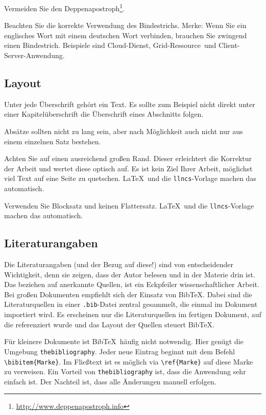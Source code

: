 \documentclass{llncs}
\begin{document}
Vermeiden Sie den Deppenapostroph\footnote{\url{http://www.deppenapostroph.info}}.

Beachten Sie die korrekte Verwendung des Bindestrichs. Merke: Wenn Sie ein englisches Wort mit einem deutschen Wort verbinden, brauchen Sie zwingend einen Bindestrich. Beispiele sind \glqq Cloud-Dienst\grqq, \glqq Grid-Ressource\grqq\ und \glqq Client-Server-Anwendung\grqq.

\subsection{Layout}

Unter jede Überschrift gehört ein Text. Es sollte zum Beispiel nicht direkt unter einer Kapitelüberschrift die Überschrift eines Abschnitts folgen.

Absätze sollten nicht zu lang sein, aber nach Möglichkeit auch nicht nur aus einem einzelnen Satz bestehen.

Achten Sie auf einen ausreichend großen Rand. Dieser erleichtert die Korrektur der Arbeit und wertet diese optisch auf. Es ist kein Ziel Ihrer Arbeit, möglichst viel Text auf eine Seite zu quetschen. \LaTeX\ und die \texttt{llncs}-Vorlage machen das automatisch.

Verwenden Sie Blocksatz und keinen Flattersatz. \LaTeX\ und die \texttt{llncs}-Vorlage machen das automatisch.

\subsection{Literaturangaben}

Die Literaturangaben (und der Bezug auf diese!) sind von entscheidender Wichtigkeit, denn sie zeigen, dass der Autor belesen und in der Materie drin ist. Das beziehen auf anerkannte Quellen, ist ein Eckpfeiler wissenschaftlicher Arbeit. Bei großen Dokumenten empfiehlt sich der Einsatz von Bib\TeX. Dabei sind die Literaturquellen in einer \verb!.bib!-Datei zentral gesammelt, die einmal im Dokument importiert wird. Es erscheinen nur die Literaturquellen im fertigen Dokument, auf die referenziert wurde und das Layout der Quellen steuert Bib\TeX.

Für kleinere Dokumente ist Bib\TeX\ häufig nicht notwendig. Hier genügt die Umgebung \texttt{thebibliography}. Jeder neue Eintrag beginnt mit dem Befehl \verb!\bibitem{Marke}!. Im Fließtext ist es möglich via \verb!\ref{Marke}! auf diese Marke zu verweisen. Ein Vorteil von \texttt{thebibliography} ist, dass die Anwendung sehr einfach ist. Der Nachteil ist, dass alle Änderungen manuell erfolgen.
\end{document}
